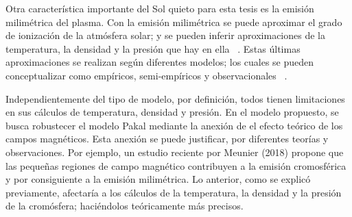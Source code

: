 Otra caracter\'istica importante del Sol quieto para esta tesis es la emisi\'on milim\'etrica del plasma. Con la emisi\'on milim\'etrica se puede aproximar el grado de ionizaci\'on de la atm\'osfera solar; y se pueden inferir aproximaciones de la temperatura, la densidad y la presi\'on que hay en ella ~\citep{millimeter}. Estas \'ultimas aproximaciones se realizan seg\'un diferentes modelos; los cuales se pueden conceptualizar como emp\'iricos, semi-emp\'iricos y observacionales ~\citep{2010ApJS..188..437D}.

Independientemente del tipo de modelo, por definici\'on, todos tienen limitaciones en sus c\'alculos de temperatura, densidad y presi\'on. En el modelo propuesto, se busca robustecer el modelo Pakal mediante la anexi\'on de el efecto te\'orico de los campos magn\'eticos. Esta anexi\'on se puede justificar, por diferentes teor\'ias y observaciones. Por ejemplo, un estudio reciente por Meunier (2018) propone que las peque\~nas regiones de campo magn\'etico contribuyen a la emisi\'on cromosf\'erica y por consiguiente a la emisi\'on milim\'etrica. Lo anterior, como se explic\'o previamente, afectar\'ia a los c\'alculos de la temperatura, la densidad y la presi\'on de la crom\'osfera; haci\'endolos te\'oricamente m\'as precisos.
